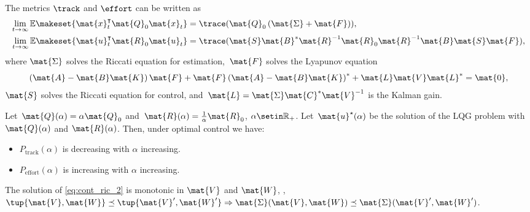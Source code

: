 {\begin{forslides}
        \begin{lemma}
            \label{lem:precision}
            The metrics $\track$ and $\effort$ can be written as
            \begin{equation}
                \begin{aligned}
                    \lim_{t\to \infty}\mathbb{E}\makeset{ \mat{x}_t^\intercal \mat{Q}_0\mat{x}_t} & =\trace(\mat{Q}_0\left( \mat{\Sigma} +\mat{F}\right)), \\
                    \lim_{t\to \infty}\mathbb{E}\makeset{ \mat{u}_t^\intercal \mat{R}_0\mat{u}_t} & =\trace(\mat{S}\mat{B}^*\mat{R}^{-1}\mat{R}_0\mat{R}^{-1}\mat{B}\mat{S}\mat{F}),
                \end{aligned}
            \end{equation}
            where
            $\mat{\Sigma}$ solves the Riccati equation for estimation,~$\mat{F}$ solves the Lyapunov equation
            \begin{equation}
                \label{eq:lyapct}
                \left( \mat{A}-\mat{B}\mat{K}\right)\mat{F}+\mat{F}\left(\mat{A}-\mat{B}\mat{K}\right)^*+\mat{L}\mat{V}\mat{L}^*=\mat{0},
            \end{equation}
            $\mat{S}$ solves the Riccati equation for control, and~$\mat{L}=\mat{\Sigma}\mat{C}^*\mat{V}^{-1}$ is the Kalman gain.
        \end{lemma}

        \begin{lemma}
            \label{lem:codesigncnt_1}
            Let~$\mat{Q}(\alpha)=\alpha \mat{Q}_0$ and~$\mat{R}(\alpha)=\frac{1}{\alpha}\mat{R}_0$, $\alpha\setin \mathbb{R}_+$.
            Let~$\mat{u}^\star(\alpha)$ be the solution of the LQG problem with $\mat{Q}(\alpha)$ and $\mat{R}(\alpha)$.
            Then, under optimal control we have:
            \begin{itemize}
                \item $P_\mathrm{track}(\alpha)$ is decreasing with $\alpha$
                      increasing.
                \item $P_\mathrm{effort}(\alpha)$ is increasing with $\alpha$ increasing.
            \end{itemize}
        \end{lemma}

        \begin{lemma}
            \label{lem:cont_V_W}
            The solution of  \cref{eq:cont_ric_2} is monotonic in $\mat{V}$ and $\mat{W}$, \ie, $\tup{\mat{V},\mat{W}}\preceq \tup{\mat{V}',\mat{W}'} \Rightarrow \mat{\Sigma}(\mat{V},\mat{W})\preceq \mat{\Sigma}(\mat{V}',\mat{W}')$.
        \end{lemma}


\end{forslides}}
